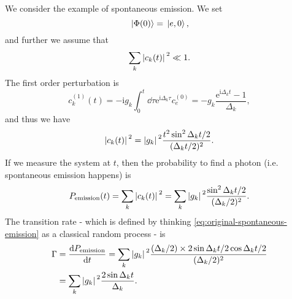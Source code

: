 \documentclass[hyperref, a4paper]{article}
\newcommand*{\ii}{\mathrm{i}}
\newcommand*{\ee}{\mathrm{e}}
\begin{document}
We consider the example of spontaneous emission. We set 
\begin{equation}
    \ket*{\Phi(0)} = \ket*{e, 0},
\end{equation}
and further we assume that 
\begin{equation}
    \sum_k \abs*{c_k(t)}^2 \ll 1.
\end{equation}
The first order perturbation is 
\[
    c^{(1)}_k(t) = - \ii g_k \int_0^t \dd{\tau} \ee^{\ii \Delta_k \tau} c^{(0)}_e = - g_k \frac{\ee^{\ii \Delta_k t} - 1}{\Delta_k},
\]
and thus we have 
\[
    \abs*{c_k(t)}^2 = \abs*{g_k}^2 \frac{t^2 \sin^2 \Delta_k t / 2}{(\Delta_k t / 2)^2} .
\]
If we measure the system at $t$, then the probability to find a photon (i.e. spontaneous emission happens) is 
\[
    P_\text{emission}(t) = \sum_k \abs*{c_k(t)}^2 = \sum_k \abs*{g_k}^2 \frac{ \sin^2 \Delta_k t / 2}{(\Delta_k / 2)^2} .
\]
The transition rate - which is defined by thinking \eqref{eq:original-spontaneous-emission} as a classical random process - is
\begin{equation}
    \begin{aligned}
        \Gamma &= \dv{P_\text{emission}}{t} = 
        \sum_k \abs*{g_k}^2 \frac{(\Delta_k / 2) \times 2 \sin \Delta_k t / 2 \cos \Delta_k t / 2 }{(\Delta_k / 2)^2} \\
        &= \sum_k \abs*{g_k}^2 \frac{2 \sin \Delta_k t  }{\Delta_k}.
    \end{aligned}
    \label{eq:original-spontaneous-emission}
\end{equation}
\end{document}
